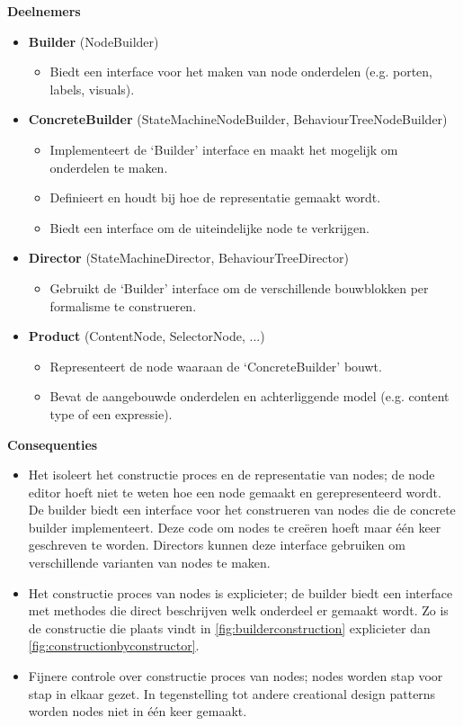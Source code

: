 \noindent\textbf{Deelnemers}
\begin{itemize}
    \item \textbf{Builder} (NodeBuilder)
    \begin{itemize}
        \item Biedt een interface voor het maken van node onderdelen (e.g. porten, labels, visuals).
    \end{itemize}

    \item \textbf{ConcreteBuilder} (StateMachineNodeBuilder, BehaviourTreeNodeBuilder)
    \begin{itemize}
        \item Implementeert de ‘Builder’ interface en maakt het mogelijk om onderdelen te maken.
        \item Definieert en houdt bij hoe de representatie gemaakt wordt. 
        \item Biedt een interface om de uiteindelijke node te verkrijgen.

    \end{itemize}

    \item \textbf{Director} (StateMachineDirector, BehaviourTreeDirector)
    \begin{itemize}
        \item Gebruikt de ‘Builder’ interface om de verschillende bouwblokken per formalisme te construeren.
    \end{itemize}
    \item \textbf{Product} (ContentNode, SelectorNode, ...)
    \begin{itemize}
        \item Representeert de node waaraan de ‘ConcreteBuilder’ bouwt.
        \item Bevat de aangebouwde onderdelen en achterliggende model (e.g. content type of een expressie).
    \end{itemize}
\end{itemize}

\noindent\textbf{Consequenties}
\begin{itemize}
    \item Het isoleert het constructie proces en de representatie van nodes; de node editor hoeft niet te weten hoe een node gemaakt en gerepresenteerd wordt. De builder biedt een interface voor het construeren van nodes die de concrete builder implementeert. Deze code om nodes te creëren hoeft maar één keer geschreven te worden. Directors kunnen deze interface gebruiken om verschillende varianten van nodes te maken.
    \item Het constructie proces van nodes is explicieter; de builder biedt een interface met methodes die direct beschrijven welk onderdeel er gemaakt wordt. Zo is de constructie die plaats vindt in \autoref{fig:builderconstruction} explicieter dan \autoref{fig:constructionbyconstructor}.
    \item Fijnere controle over constructie proces van nodes; nodes worden stap voor stap in elkaar gezet. In tegenstelling tot andere creational design patterns worden nodes niet in één keer gemaakt.
\end{itemize}

